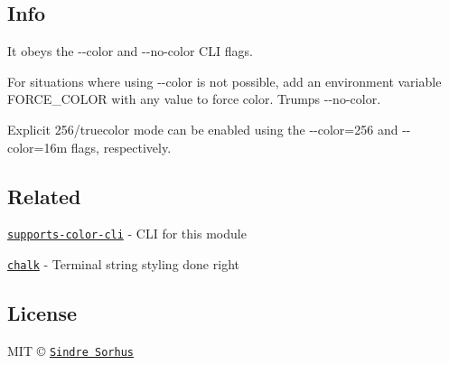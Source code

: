 \subsection*{Info}

It obeys the {\ttfamily -\/-\/color} and {\ttfamily -\/-\/no-\/color} C\+L\+I flags.

For situations where using {\ttfamily -\/-\/color} is not possible, add an environment variable {\ttfamily F\+O\+R\+C\+E\+\_\+\+C\+O\+L\+O\+R} with any value to force color. Trumps {\ttfamily -\/-\/no-\/color}.

Explicit 256/truecolor mode can be enabled using the {\ttfamily -\/-\/color=256} and {\ttfamily -\/-\/color=16m} flags, respectively.

\subsection*{Related}


\begin{DoxyItemize}
\item \href{https://github.com/chalk/supports-color-cli}{\tt supports-\/color-\/cli} -\/ C\+L\+I for this module
\item \href{https://github.com/chalk/chalk}{\tt chalk} -\/ Terminal string styling done right
\end{DoxyItemize}

\subsection*{License}

M\+I\+T © \href{http://sindresorhus.com}{\tt Sindre Sorhus} 